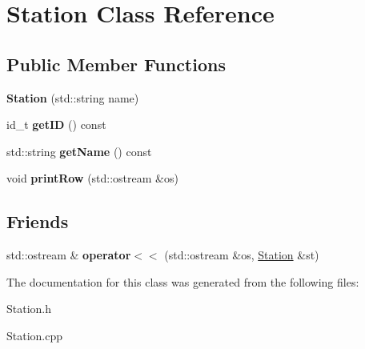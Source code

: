 \hypertarget{classStation}{}\section{Station Class Reference}
\label{classStation}
\subsection*{Public Member Functions}
\begin{DoxyCompactItemize}
\item 
\mbox{\label{classStation_a53a471eb11c9431c3e89058d558f7601}} 
{\bfseries Station} (std\+::string name)
\item 
\mbox{\label{classStation_acbc5832d77cbe29c9006212b9cc32a42}} 
id\+\_\+t {\bfseries get\+ID} () const
\item 
\mbox{\label{classStation_ac823ae175ec0e2baff462ed9612c7bae}} 
std\+::string {\bfseries get\+Name} () const
\item 
\mbox{\label{classStation_a66c028cdffd79bddd0704235b051ff4e}} 
void {\bfseries print\+Row} (std\+::ostream \&os)
\end{DoxyCompactItemize}
\subsection*{Friends}
\begin{DoxyCompactItemize}
\item 
\mbox{\label{classStation_ae5ca3266f8eead5634eb5926438392da}} 
std\+::ostream \& {\bfseries operator$<$$<$} (std\+::ostream \&os, \mbox{\hyperlink{classStation}{Station}} \&st)
\end{DoxyCompactItemize}


The documentation for this class was generated from the following files\+:\begin{DoxyCompactItemize}
\item 
Station.\+h\item 
Station.\+cpp\end{DoxyCompactItemize}
